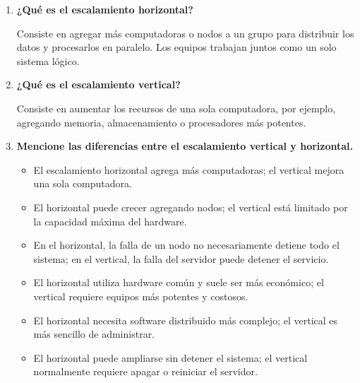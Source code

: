 \begin{enumerate}
\begin{itemize}
    \item El sistema operacional responde en milisegundos; el analítico puede tardar minutos u horas.
    \item El operacional atiende a muchos usuarios al mismo tiempo; el analítico suele ser utilizado por pocos especialistas.
    \item El operacional realiza lecturas, escrituras y actualizaciones frecuentes; el analítico trabaja principalmente con cargas y lecturas masivas.
    \item El operacional utiliza comúnmente bases NoSQL; el analítico emplea almacenes de datos, Hadoop o Spark.
    \item El operacional apoya actividades diarias; el analítico ayuda a encontrar patrones y tomar decisiones.
\end{itemize}

\item \textbf{¿Qué es el escalamiento horizontal?}

Consiste en agregar más computadoras o nodos a un grupo para distribuir los datos y procesarlos en paralelo. Los equipos trabajan juntos como un solo sistema lógico.

\item \textbf{¿Qué es el escalamiento vertical?}

Consiste en aumentar los recursos de una sola computadora, por ejemplo, agregando memoria, almacenamiento o procesadores más potentes.

\item \textbf{Mencione las diferencias entre el escalamiento vertical y horizontal.}

\begin{itemize}
    \item El escalamiento horizontal agrega más computadoras; el vertical mejora una sola computadora.
    \item El horizontal puede crecer agregando nodos; el vertical está limitado por la capacidad máxima del hardware.
    \item En el horizontal, la falla de un nodo no necesariamente detiene todo el sistema; en el vertical, la falla del servidor puede detener el servicio.
    \item El horizontal utiliza hardware común y suele ser más económico; el vertical requiere equipos más potentes y costosos.
    \item El horizontal necesita software distribuido más complejo; el vertical es más sencillo de administrar.
    \item El horizontal puede ampliarse sin detener el sistema; el vertical normalmente requiere apagar o reiniciar el servidor.
\end{itemize}

\end{enumerate}